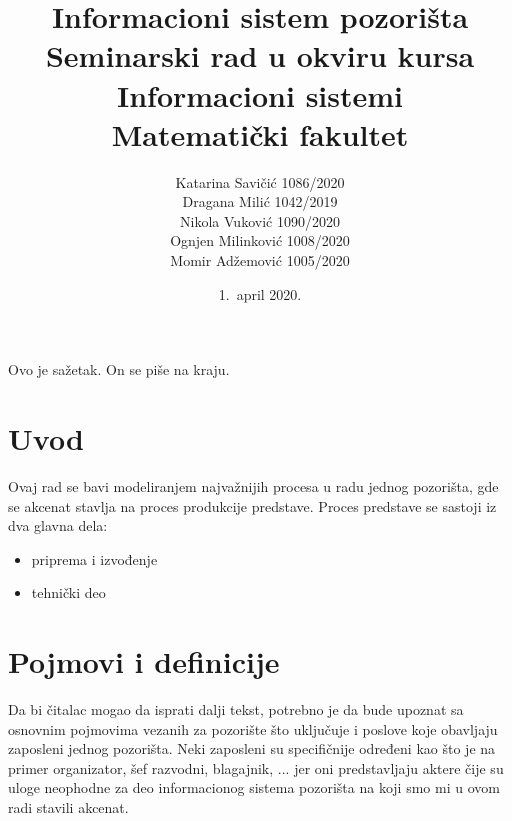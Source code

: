 \documentclass[a4paper]{article}
\begin{document}
\title{Informacioni sistem pozorišta\\ \small{Seminarski rad u okviru kursa\\Informacioni sistemi\\ Matematički fakultet}}

\author{
Katarina Savičić 1086/2020\\
Dragana Milić 1042/2019\\
Nikola Vuković 1090/2020\\
Ognjen Milinković 1008/2020\\
Momir Adžemović 1005/2020
}

\date{1.~april 2020.}

\maketitle

\abstract

Ovo je sažetak. On se piše na kraju.

\newpage

\tableofcontents

\newpage

\section{Uvod}
Ovaj rad se bavi modeliranjem najvažnijih procesa u radu jednog pozorišta, gde se akcenat
stavlja na proces produkcije predstave. Proces predstave se sastoji iz dva glavna 
dela\cite{hamilton_theatre_producing_the_drama}:
\begin{itemize}
  \item priprema i izvođenje
  \item tehnički deo
\end{itemize}

\section{Pojmovi i definicije}

Da bi čitalac mogao da isprati dalji tekst, potrebno je da bude upoznat sa osnovnim pojmovima
vezanih za pozorište što uključuje i poslove koje obavljaju zaposleni jednog pozorišta. Neki zaposleni
su specifičnije određeni kao što je na primer organizator, šef razvodni, blagajnik, ... jer oni
predstavljaju aktere čije su uloge neophodne za deo informacionog sistema pozorišta na koji smo mi
u ovom radi stavili akcenat. 
\end{document}
